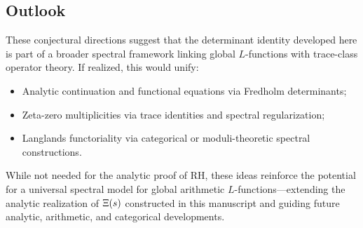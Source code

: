 \subsection*{Outlook}

These conjectural directions suggest that the determinant identity developed here is part of a broader spectral framework linking global \( L \)-functions with trace-class operator theory. If realized, this would unify:
\begin{itemize}
  \item Analytic continuation and functional equations via Fredholm determinants;
  \item Zeta-zero multiplicities via trace identities and spectral regularization;
  \item Langlands functoriality via categorical or moduli-theoretic spectral constructions.
\end{itemize}

While not needed for the analytic proof of RH, these ideas reinforce the potential for a universal spectral model for global arithmetic \( L \)-functions—extending the analytic realization of \( \Xi(s) \) constructed in this manuscript and guiding future analytic, arithmetic, and categorical developments.
